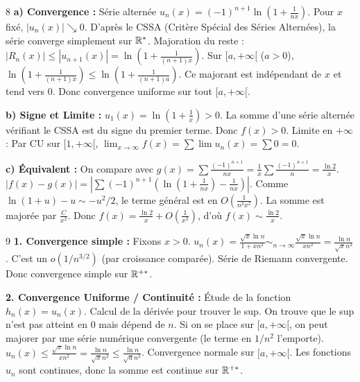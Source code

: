 \begin{correction}{8}
\textbf{a) Convergence :}
Série alternée $u_n(x) = (-1)^{n+1} \ln(1+\frac{1}{nx})$.
Pour $x$ fixé, $|u_n(x)| \searrow 0$. D'après le CSSA (Critère Spécial des Séries Alternées), la série converge simplement sur $\mathbb{R}^*$.
Majoration du reste : $|R_n(x)| \le |u_{n+1}(x)| = \ln(1+\frac{1}{(n+1)x})$.
Sur $[a, +\infty[$ ($a>0$), $\ln(1+\frac{1}{(n+1)x}) \le \ln(1+\frac{1}{(n+1)a})$.
Ce majorant est indépendant de $x$ et tend vers 0.
Donc convergence uniforme sur tout $[a, +\infty[$.

\textbf{b) Signe et Limite :}
$u_1(x) = \ln(1+\frac{1}{x}) > 0$. La somme d'une série alternée vérifiant le CSSA est du signe du premier terme. Donc $f(x) > 0$.
Limite en $+\infty$ : Par CU sur $[1, +\infty[$, $\lim_{x\to\infty} f(x) = \sum \lim u_n(x) = \sum 0 = 0$.

\textbf{c) Équivalent :}
On compare avec $g(x) = \sum \frac{(-1)^{n+1}}{nx} = \frac{1}{x} \sum \frac{(-1)^{n+1}}{n} = \frac{\ln 2}{x}$.
$|f(x) - g(x)| = \left| \sum (-1)^{n+1} (\ln(1+\frac{1}{nx}) - \frac{1}{nx}) \right|$.
Comme $\ln(1+u) - u \sim -u^2/2$, le terme général est en $O(\frac{1}{n^2 x^2})$.
La somme est majorée par $\frac{C}{x^2}$.
Donc $f(x) = \frac{\ln 2}{x} + O(\frac{1}{x^2})$, d'où $f(x) \sim \frac{\ln 2}{x}$.
\end{correction}

\begin{correction}{9}
\textbf{1. Convergence simple :}
Fixons $x > 0$. $u_n(x) = \frac{\sqrt{x} \ln n}{1+x n^2} \sim_{n\to\infty} \frac{\sqrt{x} \ln n}{x n^2} = \frac{\ln n}{\sqrt{x} n^2}$.
C'est un $o(1/n^{3/2})$ (par croissance comparée). Série de Riemann convergente.
Donc convergence simple sur $\mathbb{R}^{+*}$.

\textbf{2. Convergence Uniforme / Continuité :}
Étude de la fonction $h_n(x) = u_n(x)$.
Calcul de la dérivée pour trouver le sup.
On trouve que le sup n'est pas atteint en 0 mais dépend de $n$.
Si on se place sur $[a, +\infty[$, on peut majorer par une série numérique convergente (le terme en $1/n^2$ l'emporte).
$u_n(x) \le \frac{\sqrt{x} \ln n}{x n^2} = \frac{\ln n}{\sqrt{x} n^2} \le \frac{\ln n}{\sqrt{a} n^2}$.
Convergence normale sur $[a, +\infty[$.
Les fonctions $u_n$ sont continues, donc la somme est continue sur $\mathbb{R}^{+*}$.
\end{correction}
